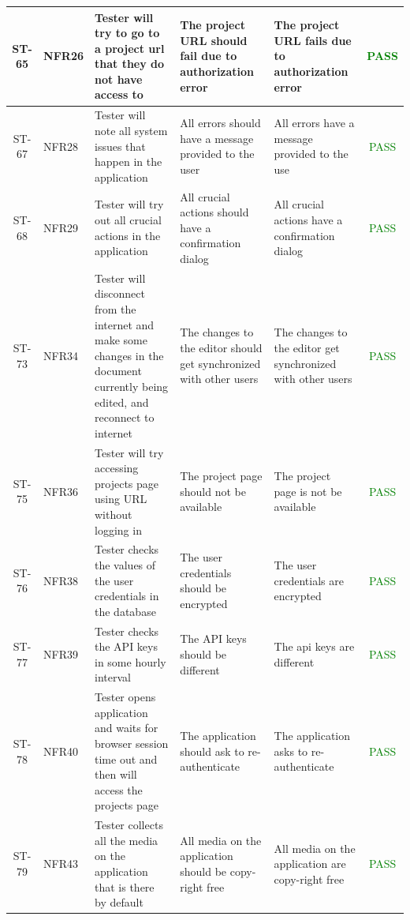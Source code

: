 \documentclass[12pt, titlepage]{article}
\begin{document}
\begin{center}
\begin{longtable}{|c|p{1.2cm}|p{2.7cm}|p{3cm}|p{3cm}|c|}
        \hline
        ST-65 & NFR26 & Tester will try to go to a project url that they do not have access to & The project URL should fail due to authorization error & The project URL fails due to authorization error &  \textcolor{green}{PASS} \\
        \hline
        ST-67 & NFR28 & Tester will note all system issues that happen in the application & All errors should have a message provided to the user & All errors have a message provided to the use &  \textcolor{green}{PASS} \\
        \hline
        ST-68 & NFR29 & Tester will try out all crucial actions in the application & All crucial actions should have a confirmation dialog & All crucial actions have a confirmation dialog &  \textcolor{green}{PASS} \\
        \hline
        ST-73 & NFR34 & Tester will disconnect from the internet and make some changes in the document currently being edited, and reconnect to internet & The changes to the editor should  get synchronized with other users & The changes to the editor get synchronized with other users &  \textcolor{green}{PASS} \\
        \hline
        ST-75 & NFR36 & Tester will try accessing projects page using URL without logging in & The project page should not be available & The project page is not be available &  \textcolor{green}{PASS} \\
        \hline
        ST-76 & NFR38 & Tester checks the values of the user credentials in the database & The user credentials should be encrypted & The user credentials are encrypted &  \textcolor{green}{PASS} \\
        \hline
        ST-77 & NFR39 & Tester checks the API keys in some hourly interval & The API keys should be different & The api keys are different &  \textcolor{green}{PASS} \\
        \hline
        ST-78 & NFR40 & Tester opens application and waits for browser session time out and then will access the projects page & The application should ask to re-authenticate & The application asks to re-authenticate &  \textcolor{green}{PASS} \\
        \hline
        ST-79 & NFR43 & Tester collects all the media on the application that is there by default  & All media on the application should be copy-right free & All media on the application are copy-right free &  \textcolor{green}{PASS} \\
        \hline
    \end{longtable}
\end{center}
	
\end{document}
